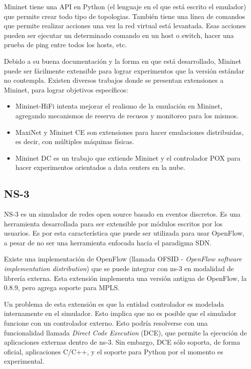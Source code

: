 Mininet tiene una API en Python (el lenguaje en el que está escrito el emulador) que permite crear todo tipo de topologias. También tiene una línea de comandos que permite realizar acciones una vez la red virtual está levantada. Esas acciones pueden ser ejecutar un determinado comando en un host o switch, hacer una prueba de ping entre todos los hosts, etc.

Debido a su buena documentación y la forma en que está desarrollado, Mininet puede ser fácilmente extensible para lograr experimentos que la versión estándar no contempla. Existen diversos trabajos donde se presentan extensiones a Mininet, para lograr objetivos específicos:
\begin{itemize}
	\item Mininet-HiFi \cite{mininet-hifi} intenta mejorar el realismo de la emulación en Mininet, agregando mecanismos de reserva de recusos y monitoreo para los mismos.
	\item MaxiNet \cite{maxinet} y Mininet CE \cite{mininet-ce} son extensiones para hacer emulaciones distribuidas, es decir, con múltiples máquinas físicas.
	\item Mininet DC \cite{mininet-dc} es un trabajo que extiende Mininet y el controlador POX para hacer experimentos orientados a data centers en la nube.
\end{itemize}
\subsection{NS-3}
NS-3 es un simulador de redes open source basado en eventos discretos. Es una herramienta desarrollada para ser extensible por módulos escritos por los usuarios. Es por esta característica que puede ser utilizada para usar OpenFlow, a pesar de no ser una herramienta enfocada hacia el paradigma SDN.

Existe una implementación de OpenFlow \cite{ns-3-openflow} (llamada OFSID - \textit{OpenFlow software implementation distribution}) que se puede integrar con ns-3 en modalidad de librería externa. Esta extensión implementa una versión antigua de OpenFlow, la 0.8.9, pero agrega soporte para MPLS.

Un problema de esta extensión es que la entidad controlador es modelada internamente en el simulador. Esto implica que no es posible que el simulador funcione con un controlador externo. Esto podría resolverse con una funcionalidad llamada \textit{Direct Code Execution} (DCE), que permite la ejecución de aplicaciones externas dentro de ns-3. Sin embargo, DCE sólo soporta, de forma oficial, aplicaciones C/C++, y el soporte para Python por el momento es experimental.

